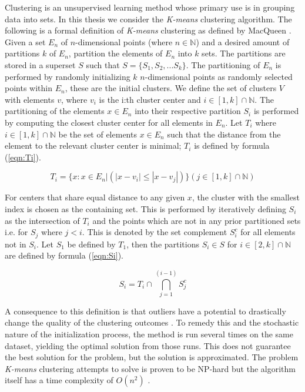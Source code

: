 Clustering is an unsupervised learning method whose primary use is in grouping data into sets. In this thesis we consider the \textit{K-means} clustering algorithm. The following is a formal definition of \textit{K-means} clustering as defined by MacQueen \cite{macqueen}. Given a set $E_n$ of $n$-dimensional points (where $n \in \mathbb{N}$) and a desired amount of partitions $k$ of $E_n$, partition the elements of $E_n$ into $k$ sets. The partitions are stored in a superset $S$ such that $S = \{S_1, S_2, ... S_k\}$. The partitioning of $E_n$ is performed by randomly initializing $k$ $n$-dimensional points as randomly selected points within $E_n$, these are the initial clusters. We define the set of clusters $V$ with elements $v$, where $v_i$ is the i:th cluster center and $i \in [1, k] \cap \mathbb{N}$. The partitioning of the elements $x \in E_n$ into their respective partition $S_i$ is performed by computing the closest cluster center for all elements in $E_n$. Let $T_i$ where $i \in [1, k] \cap \mathbb{N}$ be the set of elements $x \in E_n$ such that the distance from the element to the relevant cluster center is minimal; $T_i$ is defined by formula (\ref{eqn:Ti}).

\begin{equation}
\label{eqn:Ti}
T_i = \{x : x \in E_n | (|x - v_i| \leq |x - v_j|)\} (j \in [1, k] \cap \mathbb{N})
\end{equation}

For centers that share equal distance to any given $x$, the cluster with the smallest index is chosen as the containing set. This is performed by iteratively defining $S_i$ as the intersection of $T_i$ and the points which are not in any prior partitioned sets i.e. for $S_j$ where $j < i$. This is denoted by the set complement $S_i^c$ for all elements not in $S_i$. Let $S_1$ be defined by $T_1$, then the partitions $S_i \in S$ for $i \in [2, k] \cap \mathbb{N}$ are defined by formula (\ref{eqn:Si}).

\begin{equation}
\label{eqn:Si}
S_i = T_i \cap \bigcap_{j=1}^{(i-1)} S_j^c
\end{equation}

A consequence to this definition is that outliers have a potential to drastically change the quality of the clustering outcomes \cite{chawla2013k}. To remedy this and the stochastic nature of the initialization process, the method is run several times on the same dataset, yielding the optimal solution from those runs. This does not guarantee the best solution for the problem, but the solution is approximated. The problem \textit{K-means} clustering attempts to solve is proven to be NP-hard \cite{chawla2013k, mahajan2009planar} but the algorithm itself has a time complexity of $O(n^2)$ \cite{pakhira2014linear}.


